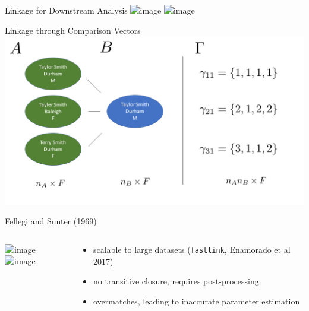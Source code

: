 \documentclass{beamer}
\begin{document}
	\begin{frame}{Linkage for Downstream Analysis}
	\includegraphics<1>[width = \textwidth, height = .7\textwidth ]{datasets.png}
	\includegraphics<2>[width = \textwidth, height = .7\textwidth ]{datasets_linked.png}

\end{frame}

	\begin{frame}{Linkage through Comparison Vectors}
		\includegraphics[width = \textwidth, height = .7\textwidth ]{fs_graphic.png}
	\end{frame}

\begin{frame}{Fellegi and Sunter (1969)}
	\begin{columns}
		\begin{column}{0.6\textwidth}
			\includegraphics<1>[width = \textwidth, height = 1.2\textwidth ]{rl_graphics_all/Slide1.png}
			\includegraphics<2->[width = \textwidth, height = 1.2\textwidth ]{rl_graphics_all/Slide2.png}

		\end{column}
		\begin{column}{0.38\textwidth}
			\begin{itemize}
				\item<3-> scalable to large datasets (\texttt{fastlink}, Enamorado et al 2017)
				\item<4-> no transitive closure, requires post-processing
				\pause 
				\item<5-> overmatches, leading to inaccurate parameter estimation
			\end{itemize}

		\end{column}
	\end{columns}
\end{frame}
\end{document}
